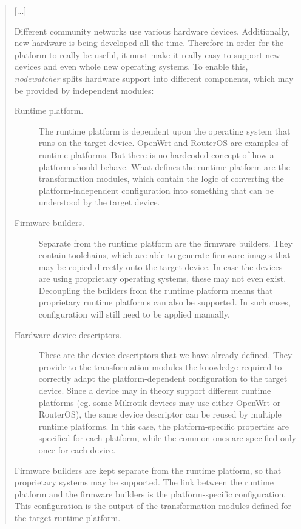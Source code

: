 \documentclass[12pt,twoside,a4paper]{report}
\newcommand{\nodewatcher}{\textit{nodewatcher}}
\begin{document}
\begin{quote}

[...]

Different community networks use various hardware devices.
Additionally, new hardware is being developed all the time.
Therefore in order for the platform to really be useful, it must make it really easy to support new devices and even whole new operating systems.
To enable this, \nodewatcher{} splits hardware support into different components, which may be provided by independent modules:

\begin{description}
    \item[Runtime platform.] The runtime platform is dependent upon the operating system that runs on the target device.
    OpenWrt and RouterOS are examples of runtime platforms.
    But there is no hardcoded concept of how a platform should behave.
    What defines the runtime platform are the transformation modules, which contain the logic of converting the platform-independent configuration into something that can be understood by the target device.

    \item[Firmware builders.] Separate from the runtime platform are the firmware builders.
    They contain toolchains, which are able to generate firmware images that may be copied directly onto the target device.
    In case the devices are using proprietary operating systems, these may not even exist.
    Decoupling the builders from the runtime platform means that proprietary runtime platforms can also be supported.
    In such cases, configuration will still need to be applied manually.

    \item[Hardware device descriptors.] These are the device descriptors that we have already defined.
    They provide to the transformation modules the knowledge required to correctly adapt the platform-dependent configuration to the target device.
    Since a device may in theory support different runtime platforms (eg. some Mikrotik devices may use either OpenWrt or RouterOS), the same device descriptor can be reused by multiple runtime platforms.
    In this case, the platform-specific properties are specified for each platform, while the common ones are specified only once for each device.
\end{description}

Firmware builders are kept separate from the runtime platform, so that proprietary systems may be supported.
The link between the runtime platform and the firmware builders is the platform-specific configuration.
This configuration is the output of the transformation modules defined for the target runtime platform.


\end{quote}
\end{document}
